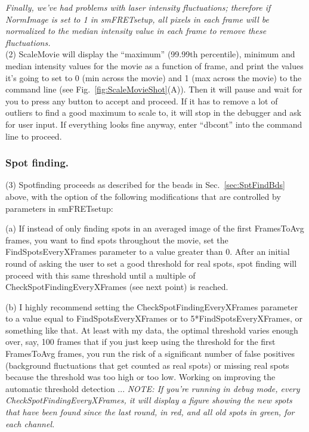 \documentclass[11pt]{article}
\begin{document}
{\it Finally, we've had problems with laser intensity fluctuations; therefore if NormImage is set to 1 in smFRETsetup, all pixels in each frame will be normalized to the median intensity value in each frame to remove these fluctuations.} \\

\noindent (2) ScaleMovie will display the ``maximum'' (99.99th percentile), minimum and median intensity values for the movie as a function of frame, and print the values it's going to set to 0 (min across the movie) and 1 (max across the movie) to the command line (see Fig.~\ref{fig:ScaleMovieShot}(A)).  Then it will pause and wait for you to press any button to accept and proceed.  If it has to remove a lot of outliers to find a good maximum to scale to, it will stop in the debugger and ask for user input.  If everything looks fine anyway, enter ``dbcont'' into the command line to proceed.

\subsubsection{Spot finding.}

\noindent (3) Spotfinding proceeds as described for the beads in Sec.~\ref{sec:SptFindBds} above, with the option of the following modifications that are controlled by parameters in smFRETsetup:

(a) If instead of only finding spots in an averaged image of the first FramesToAvg frames, you want to find spots throughout the movie, set the FindSpotsEveryXFrames parameter to a value greater than 0.  After an initial round of asking the user to set a good threshold for real spots, spot finding will proceed with this same threshold until a multiple of CheckSpotFindingEveryXFrames (see next point) is reached.

(b) I highly recommend setting the CheckSpotFindingEveryXFrames parameter to a value equal to FindSpotsEveryXFrames or to 5*FindSpotsEveryXFrames, or something like that.  At least with my data, the optimal threshold varies enough over, say, 100 frames that if you just keep using the threshold for the first FramesToAvg frames, you run the risk of a significant number of false positives (background fluctuations that get counted as real spots) or missing real spots because the threshold was too high or too low.  Working on improving the automatic threshold detection ... {\it NOTE: If you're running in debug mode, every CheckSpotFindingEveryXFrames, it will display a figure showing the new spots that have been found since the last round, in red, and all old spots in green, for each channel. }\\
\end{document}
